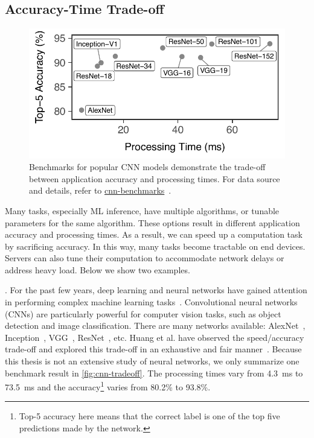 \subsection{Accuracy-Time Trade-off}
\label{sec:comp-perf-model}

\begin{figure}[t]
  \centering
  \includegraphics[width=.7\columnwidth]{figures/tradeoff-cnn.pdf}
  \caption{Benchmarks for popular CNN models demonstrate the trade-off between
    application accuracy and processing times. For data source and details,
    refer to
    \href{https://github.com/jcjohnson/cnn-benchmarks}{cnn-benchmarks}~\cite{cnn.benchmarks}.
  }
  \label{fig:cnn-tradeoff}
\end{figure}

Many tasks, especially ML inference, have multiple algorithms, or tunable
parameters for the same algorithm. These options result in different application
accuracy and processing times. As a result, we can speed up a computation task
by sacrificing accuracy. In this way, many tasks become tractable on end
devices. Servers can also tune their computation to accommodate network delays
or address heavy load. Below we show two examples.

. For the past few years, deep
learning and neural networks have gained attention in performing complex machine
learning tasks~\cite{goodfellow2016deep}. Convolutional neural networks (CNNs)
are particularly powerful for computer vision tasks, such as object detection
and image classification. There are many networks available:
AlexNet~\cite{krizhevsky2012imagenet}, Inception~\cite{szegedy2015going},
VGG~\cite{simonyan2014very}, ResNet~\cite{he2016deep}, etc. Huang et al. have
observed the speed/accuracy trade-off and explored this trade-off in an
exhaustive and fair manner~\cite{huang2016speed}. Because this thesis is not an
extensive study of neural networks, we only summarize one benchmark result in
\autoref{fig:cnn-tradeoff}. The processing times vary from \SI{4.3}{\ms} to
\SI{73.5}{\ms} and the accuracy\footnote{Top-5 accuracy here means that the
  correct label is one of the top five predictions made by the network.} varies
from 80.2\% to 93.8\%.


